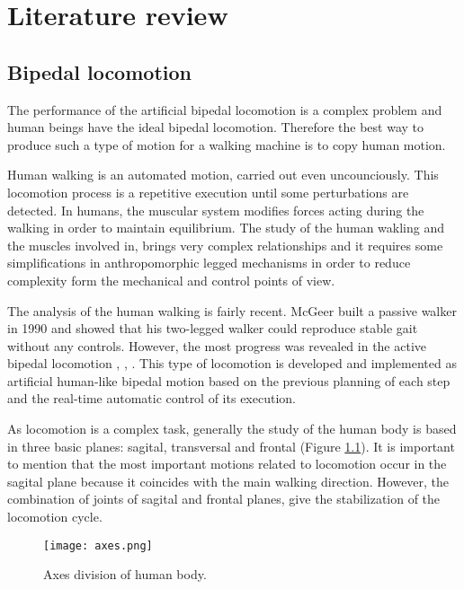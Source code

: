 \chapter{Literature review}



\section{Bipedal locomotion}
The performance of the artificial bipedal locomotion is a complex problem and human beings have the ideal bipedal locomotion. Therefore the best way to produce such a type of motion for a walking machine is to copy human motion.

Human walking is an automated motion, carried out even uncounciously. This locomotion process is a repetitive execution until some perturbations are detected. In humans, the muscular system modifies forces acting during the walking in order to maintain equilibrium. The study of the human wakling and the muscles involved in, brings very complex relationships and it requires some simplifications in anthropomorphic legged mechanisms in order to reduce complexity form the mechanical and control points of view.

The analysis of the human walking is fairly recent. McGeer \cite{McGeer1990} built a passive walker in 1990 and showed that his two-legged walker could reproduce stable gait without any controls. However, the most progress was revealed in the active bipedal locomotion \cite{Hirai1998}, \cite{Kaneko2004}, \cite{Park2007}. This type of locomotion is developed and implemented as artificial human-like bipedal motion based on the previous planning of each step and the real-time automatic control of its execution. 

As locomotion is a complex task, generally the study of the human body is based in three basic planes: sagital, transversal and frontal (Figure \ref{fig:axes}). It is important to mention that the most important motions related to locomotion occur in the sagital plane because it coincides with the main walking direction. However, the combination of joints of sagital and frontal planes, give the stabilization of the locomotion cycle.

\begin{figure}[!h]
\centering
\texttt{[image: axes.png]}
\caption{Axes division of human body.}
\label{fig:axes}
\end{figure}

